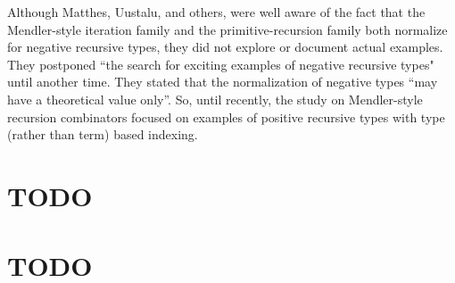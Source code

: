 Although Matthes, Uustalu, and others, were well aware of the fact that
the Mendler-style iteration family and the primitive-recursion family both
normalize for negative recursive types, they did not explore or document actual
examples. They postponed ``the search for exciting examples of negative
recursive types" until another time. They stated that the normalization
of negative types ``may have a theoretical value
only''\cite{UusVen99}. So, until recently, the study on Mendler-style recursion
combinators focused on examples of positive recursive types with type (rather than term) based indexing.



\section{TODO}

\section{TODO}

